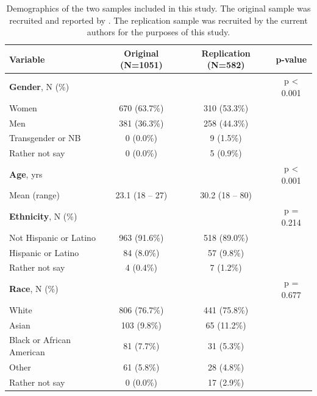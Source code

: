 \documentclass[letterpaper,man,natbib,noextraspace,floatsintext,longtable,12pt]{apa6}
\begin{document}
\begin{table}[t!]
    \centering
    \begin{tabular*}{\textwidth}{lccc}
    \toprule
    Variable & Original (N=1051) & Replication (N=582) & p-value \\
    \midrule
    \textbf{Gender}, N (\%)                & & & p < 0.001 \\
    \hspace{1em} Women                     & 670 (63.7\%) & 310 (53.3\%) & \\
    \hspace{1em} Men                       & 381 (36.3\%) & 258 (44.3\%) & \\
    \hspace{1em} Transgender or NB         &   0  (0.0\%) &   9  (1.5\%) & \\
    \hspace{1em} Rather not say            &   0  (0.0\%) &   5  (0.9\%) & \\
    \midrule
    \textbf{Age}, yrs                      & & & p < 0.001 \\
    \hspace{1em} Mean (range)              & 23.1 (18 -- 27) & 30.2 (18 -- 80) & \\
    \midrule
    \textbf{Ethnicity}, N (\%)             & & & p = 0.214 \\
    \hspace{1em} Not Hispanic or Latino    & 963 (91.6\%) & 518 (89.0\%) & \\
    \hspace{1em} Hispanic or Latino        &  84  (8.0\%) &  57  (9.8\%) & \\
    \hspace{1em} Rather not say            &   4  (0.4\%) &   7  (1.2\%) & \\
    \midrule
    \textbf{Race}, N (\%)                  & & & p = 0.677 \\
    \hspace{1em} White                     & 806 (76.7\%) & 441 (75.8\%) & \\ 
    \hspace{1em} Asian                     & 103  (9.8\%) &  65 (11.2\%) & \\
    \hspace{1em} Black or African American &  81  (7.7\%) &  31  (5.3\%) & \\
    \hspace{1em} Other                     &  61  (5.8\%) &  28  (4.8\%) & \\
    \hspace{1em} Rather not say            &   0  (0.0\%) &  17  (2.9\%) & \\
    \bottomrule
    \end{tabular*}
    \caption{\normalfont Demographics of the two samples included in this study. The original sample was recruited and reported by \cite{teicher2015maltreatment}. The replication sample was recruited by the current authors for the purposes of this study.}
    \label{tab:demographics}
\end{table}
\end{document}
